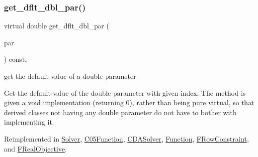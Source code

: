 \mbox{\label{class_s_m_spp__di__unipi__it_1_1_thin_compute_interface_ae2d249f431892cbf41ccf19204b78228}} 
\subsubsection{\texorpdfstring{get\+\_\+dflt\+\_\+dbl\+\_\+par()}{get\_dflt\_dbl\_par()}}
{\footnotesize\ttfamily virtual double get\+\_\+dflt\+\_\+dbl\+\_\+par (\begin{DoxyParamCaption}\item[{const \mbox{\hyperlink{class_s_m_spp__di__unipi__it_1_1_thin_compute_interface_aa3d710629ad8c434286726ad810c3b47}{idx\+\_\+type}}}]{par }\end{DoxyParamCaption}) const\hspace{0.3cm}{\ttfamily [inline]}, {\ttfamily [virtual]}}



get the default value of a double parameter 

Get the default value of the double parameter with given index. The method is given a void implementation (returning 0), rather than being pure virtual, so that derived classes not having any double parameter do not have to bother with implementing it. 

Reimplemented in \mbox{\hyperlink{class_s_m_spp__di__unipi__it_1_1_solver_a465a771c115acf8d5f4e32e22f003014}{Solver}}, \mbox{\hyperlink{class_s_m_spp__di__unipi__it_1_1_c05_function_a465a771c115acf8d5f4e32e22f003014}{C05\+Function}}, \mbox{\hyperlink{class_s_m_spp__di__unipi__it_1_1_c_d_a_solver_a465a771c115acf8d5f4e32e22f003014}{C\+D\+A\+Solver}}, \mbox{\hyperlink{class_s_m_spp__di__unipi__it_1_1_function_a465a771c115acf8d5f4e32e22f003014}{Function}}, \mbox{\hyperlink{class_s_m_spp__di__unipi__it_1_1_f_row_constraint_a465a771c115acf8d5f4e32e22f003014}{F\+Row\+Constraint}}, and \mbox{\hyperlink{class_s_m_spp__di__unipi__it_1_1_f_real_objective_a465a771c115acf8d5f4e32e22f003014}{F\+Real\+Objective}}.

\mbox{\label{class_s_m_spp__di__unipi__it_1_1_thin_compute_interface_aee367363e42f86be5376165878f958f5}} 
